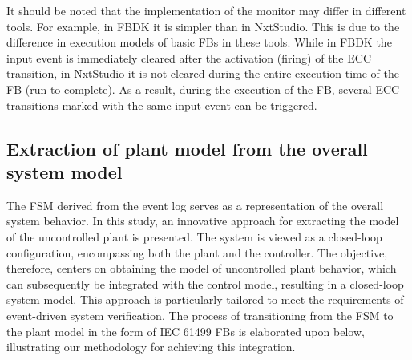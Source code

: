 \documentclass{ieeeojies}
\begin{document}
It should be noted that the implementation of the monitor may differ in different tools. For example, in FBDK \cite{holobloc} it is simpler than in NxtStudio. This is due to the difference in execution models of basic FBs in these tools. While in FBDK the input event is immediately cleared after the activation (firing) of the ECC transition, in NxtStudio it is not cleared during the entire execution time of the FB (run-to-complete). As a result, during the execution of the FB, several ECC transitions marked with the same input event can be triggered.

\subsection{Extraction of plant model from the overall system model}

The FSM derived from the event log serves as a representation of the overall system behavior. In this study, an innovative approach for extracting the model of the uncontrolled plant is presented. The system is viewed as a closed-loop configuration, encompassing both the plant and the controller. The objective, therefore, centers on obtaining the model of uncontrolled plant behavior, which can subsequently be integrated with the control model, resulting in a closed-loop system model. This approach is particularly tailored to meet the requirements of event-driven system verification. The process of transitioning from the FSM to the plant model in the form of IEC 61499 FBs is elaborated upon below, illustrating our methodology for achieving this integration.
\end{document}
